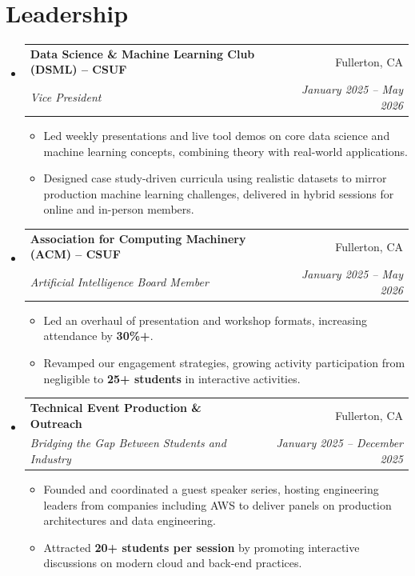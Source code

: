 \documentclass[letterpaper,11pt]{article}
\makeatletter
\newcommand{\resumeItem}[1]{
  \item\small{{#1 \vspace{-3pt}}}
}
\newcommand{\resumeSubheading}[4]{
  \vspace{-5pt}\item
    \begin{tabular*}{0.97\textwidth}[t]{l@{\extracolsep{\fill}}r}
      \textbf{#1} & #2 \\
      \textit{\small#3} & \textit{\small #4} \\
    \end{tabular*}\vspace{-9pt}
}
\newcommand{\resumeSubHeadingListStart}{\begin{itemize}[leftmargin=0.15in, label={}]}
\newcommand{\resumeSubHeadingListEnd}{\end{itemize}}
\newcommand{\resumeItemListStart}{\begin{itemize}}
\newcommand{\resumeItemListEnd}{\end{itemize}\vspace{-7pt}}
\makeatother
\begin{document}
\section{Leadership}
\resumeSubHeadingListStart
  \resumeSubheading
    {Data Science \& Machine Learning Club (DSML) -- CSUF}{Fullerton, CA}
    {Vice President}{January 2025 -- May 2026}
    \resumeItemListStart
      \resumeItem{Led weekly presentations and live tool demos on core data science and machine learning concepts, combining theory with real-world applications.}
      \resumeItem{Designed case study-driven curricula using realistic datasets to mirror production machine learning challenges, delivered in hybrid sessions for online and in-person members.}
    \resumeItemListEnd

  \resumeSubheading
    {Association for Computing Machinery (ACM) -- CSUF}{Fullerton, CA}
    {Artificial Intelligence Board Member}{January 2025 -- May 2026}
    \resumeItemListStart
      \resumeItem{Led an overhaul of presentation and workshop formats, increasing attendance by \textbf{30\%+}.}
      \resumeItem{Revamped our engagement strategies, growing activity participation from negligible to \textbf{25+ students} in interactive activities.}
    \resumeItemListEnd

  \resumeSubheading
    {Technical Event Production \& Outreach}{Fullerton, CA}
    {Bridging the Gap Between Students and Industry}{January 2025 -- December 2025}
    \resumeItemListStart
      \resumeItem{Founded and coordinated a guest speaker series, hosting engineering leaders from companies including AWS to deliver panels on production architectures and data engineering.}
      \resumeItem{Attracted \textbf{20+ students per session} by promoting interactive discussions on modern cloud and back-end practices.}
    \resumeItemListEnd
\resumeSubHeadingListEnd

\end{document}
